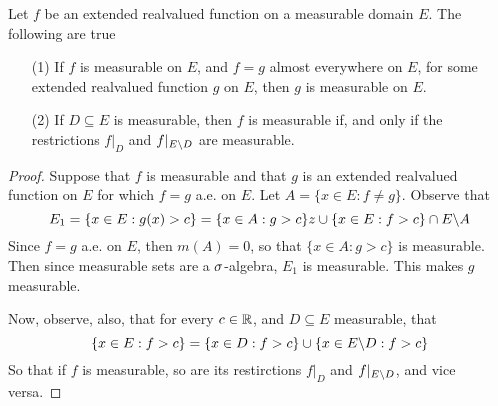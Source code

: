 \begin{lemma}\label{3.1.4}
    Let $f$ be an extended realvalued function on a measurable domain  $E$. The
    following are true
    \begin{enumerate}
        \item[(1)] If $f$ is measurable on $E$, and  $f=g$ almost everywhere on
             $E$, for some extended realvalued function $g$ on $E$, then  $g$ is
             measurable on  $E$.

         \item[(2)] If $D \subseteq E$ is measurable, then  $f$ is measurable
             if, and only if the restrictions  $f|_D$ and  $f|_{E\backslash D}$ are
             measurable.
    \end{enumerate}
\end{lemma}
\begin{proof}
    Suppose that $f$ is measurable and that $g$ is an extended realvalued
    function on $E$ for which  $f=g$ a.e. on  $E$. Let  $A=\{x \in E : f \neq
    g\}$. Observe that
    \begin{equation*}
        E_1=\{x \in E : g(x)>c\}=\{x \in A : g>c\}z \cup \{x \in E : f>c\}
        \cap E\backslash A
    \end{equation*}
    Since $f=g$ a.e. on  $E$, then  $m(A)=0$, so that $\{x \in A : g>c\}$ is
    measurable. Then since measurable sets are a $\sigma$-algebra, $E_1$ is
    measurable. This makes $g$ measurable.

    Now, observe, also, that for every  $c \in \mathbb{R}$, and  $D \subseteq E$
    measurable, that
    \begin{equation*}
        \{x \in E : f>c\}=\{x \in D : f>c\} \cup \{x \in E\backslash D : f>c\}
    \end{equation*}
    So that if $f$ is measurable, so are its restirctions  $f|_D$ and
    $f|_{E\backslash D}$, and vice versa.
\end{proof}

